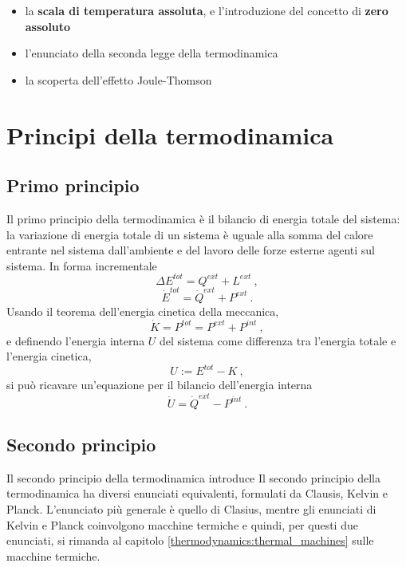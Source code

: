 \begin{itemize}
        \begin{itemize}
            \item la \textbf{scala di temperatura assoluta}, e l'introduzione del concetto di \textbf{zero assoluto}
            \item l'enunciato della seconda legge della termodinamica
            \item la scoperta dell'effetto Joule-Thomson
        \end{itemize}
\end{itemize}


\chapter{Principi della termodinamica}\label{thermodynamics:principles}
\section{Primo principio}
Il primo principio della termodinamica è il bilancio di energia totale del sistema: la variazione di energia totale di un sistema è uguale alla somma del calore entrante nel sistema dall'ambiente e del lavoro delle forze esterne agenti sul sistema. In forma incrementale
\begin{equation}
  \Delta E^{tot} = Q^{ext} + L^{ext} \ ,
\end{equation}
\begin{equation}
  \dot{E}^{tot} = \dot{Q}^{ext} + P^{ext} \ .
\end{equation}
%
Usando il teorema dell'energia cinetica della meccanica,
\begin{equation}
  \dot{K} = P^{tot} = P^{ext} + P^{int} \ ,
\end{equation}
e definendo l'energia interna $U$ del sistema come differenza tra l'energia totale e l'energia cinetica,
\begin{equation}
  U := E^{tot} - K \ ,
\end{equation}
si può ricavare un'equazione per il bilancio dell'energia interna
\begin{equation}
  \dot{U} = \dot{Q}^{ext} - P^{int} \ .
\end{equation}

\section{Secondo principio}
Il secondo principio della termodinamica introduce
Il secondo principio della termodinamica ha diversi enunciati equivalenti, formulati da Clausis, Kelvin e Planck.
L'enunciato più generale è quello di Clasius, mentre gli enunciati di Kelvin e Planck coinvolgono macchine termiche e quindi, per questi due enunciati, si rimanda al capitolo \ref{thermodynamics:thermal_machines} sulle macchine termiche.

